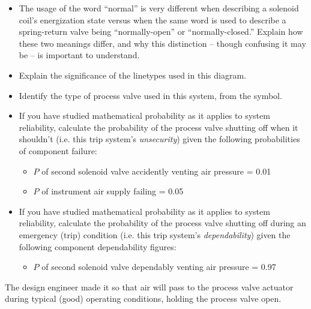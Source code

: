 \begin{itemize}
\item{} The usage of the word ``normal'' is very different when describing a solenoid coil's energization state versus when the same word is used to describe a spring-return valve being ``normally-open'' or ``normally-closed.''  Explain how these two meanings differ, and why this distinction -- though confusing it may be -- is important to understand.
\item{} Explain the significance of the linetypes used in this diagram.
\item{} Identify the type of process valve used in this system, from the symbol.
\item{} If you have studied mathematical probability as it applies to system reliability, calculate the probability of the process valve shutting off when it shouldn't (i.e. this trip system's {\it unsecurity}) given the following probabilities of component failure:
\begin{itemize}

\item{} $P$ of second solenoid valve accidently venting air pressure = 0.01
\item{} $P$ of instrument air supply failing = 0.05
\end{itemize}
\item{} If you have studied mathematical probability as it applies to system reliability, calculate the probability of the process valve shutting off during an emergency (trip) condition (i.e. this trip system's {\it dependability}) given the following component dependability figures:
\begin{itemize}

\item{} $P$ of second solenoid valve dependably venting air pressure = 0.97
\end{itemize}
\end{itemize}














The design engineer made it so that air will pass to the process valve actuator during typical (good) operating conditions, holding the process valve open.

